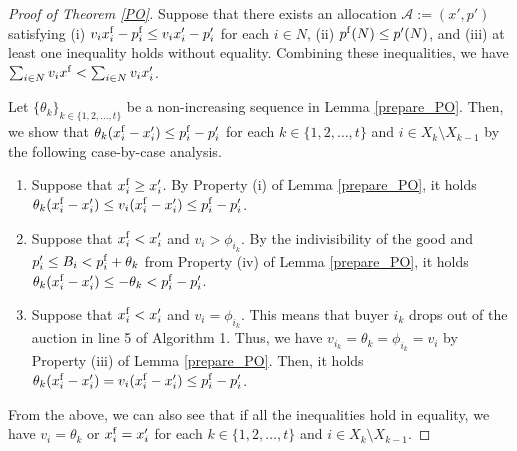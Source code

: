 \documentclass[letterpaper,11pt]{article}
\begin{document}
\begin{proof}[Proof of Theorem \ref{PO}]
Suppose that there exists an allocation $\mathcal A:=(x',p')$ satisfying (i)
$v_i x^{\rm f}_i-p^{\rm f}_i\leq v_i x'_i - p'_i$ for each $i\in N$, (ii) $p^{\rm f}(N)\leq p'(N)$, and 
(iii) at least one inequality holds without equality. 
Combining these inequalities, 
we have $\sum_{i\in N}v_i x^{\rm f}<\sum_{i\in N}v_i x'_i$.

Let $\{\theta_{k}\}_{k\in \{1,2,\ldots,t\}}$ be a non-increasing sequence in Lemma \ref{prepare_PO}.
Then, we show that $\theta_{k} (x^{\rm f}_{i}-x'_{i}) \leq p^{\rm f}_{i}- p'_{i}$ for each $k\in \{1,2,\ldots,t\}$ and $i\in X_{k}\setminus X_{k-1}$ by the following case-by-case analysis.

\begin{enumerate}
\item Suppose that $x^{\rm f}_i\geq x'_i$.
By Property (i) of Lemma \ref{prepare_PO}, it holds $\theta_{k} (x^{\rm f}_i-x'_i)\leq v_i (x^{\rm f}_i-x'_i) \leq p^{\rm f}_i- p'_i$.
\item Suppose that $x^{\rm f}_i< x'_i$ and $v_i> \phi_{i_k}$. By the indivisibility of the good and $p'_i\leq B_i<p^{\rm f}_i+\theta_{k}$ from Property (iv) of Lemma \ref{prepare_PO}, 
it holds $\theta_{k} (x^{\rm f}_i-x'_i)\leq -\theta_{k} < p^{\rm f}_i- p'_i$.
\item Suppose that $x^{\rm f}_i< x'_i$ and $v_i=\phi_{i_k}$. 
This means that buyer $i_k$ drops out of the auction in line 5 of Algorithm 1.
Thus, we have  $v_{i_k}=\theta_{k}=\phi_{i_k}=v_i$ 
by Property (iii) of Lemma \ref{prepare_PO}.
Then, it holds $\theta_{k} (x^{\rm f}_i-x'_i)=v_{i} (x^{\rm f}_i-x'_i) \leq p^{\rm f}_i- p'_i$.
\end{enumerate}
From the above, we can also see that if all the inequalities hold in equality, 
we have $v_i=\theta_{k}$ or $x^{\rm f}_i= x'_i$ 
for each $k\in \{1,2,\ldots,t\}$ and $i\in X_k\setminus X_{k-1}$.



\end{proof}
\end{document}
